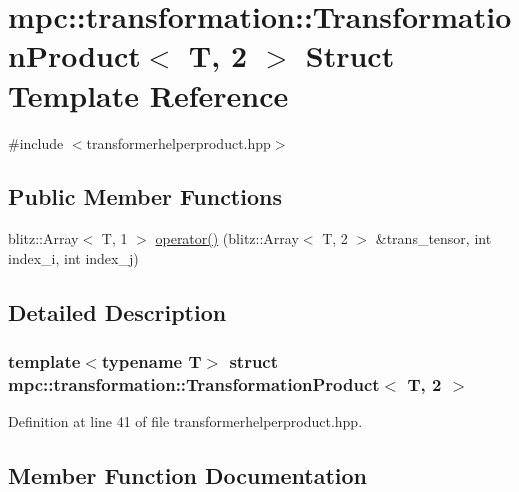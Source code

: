 \hypertarget{structmpc_1_1transformation_1_1_transformation_product_3_01_t_00_012_01_4}{}\section{mpc\+:\+:transformation\+:\+:Transformation\+Product$<$ T, 2 $>$ Struct Template Reference}
\label{structmpc_1_1transformation_1_1_transformation_product_3_01_t_00_012_01_4}


{\ttfamily \#include $<$transformerhelperproduct.\+hpp$>$}

\subsection*{Public Member Functions}
\begin{DoxyCompactItemize}
\item 
blitz\+::\+Array$<$ T, 1 $>$ \mbox{\hyperlink{structmpc_1_1transformation_1_1_transformation_product_3_01_t_00_012_01_4_ad0327d3f0f74b391f42ea75e00e4b47c}{operator()}} (blitz\+::\+Array$<$ T, 2 $>$ \&trans\+\_\+tensor, int index\+\_\+i, int index\+\_\+j)
\end{DoxyCompactItemize}


\subsection{Detailed Description}
\subsubsection*{template$<$typename T$>$\newline
struct mpc\+::transformation\+::\+Transformation\+Product$<$ T, 2 $>$}



Definition at line 41 of file transformerhelperproduct.\+hpp.



\subsection{Member Function Documentation}
\mbox{\label{structmpc_1_1transformation_1_1_transformation_product_3_01_t_00_012_01_4_ad0327d3f0f74b391f42ea75e00e4b47c}} 
